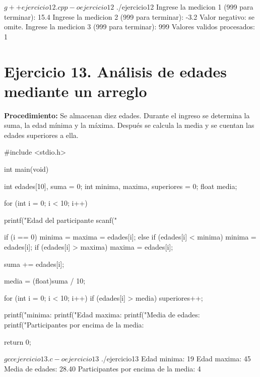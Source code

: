 \documentclass[11pt, a4paper]{article}
\begin{document}
\begin{terminalout}
$ g++ ejercicio12.cpp -o ejercicio12
$ ./ejercicio12
Ingrese la medicion 1 (999 para terminar): 15.4
Ingrese la medicion 2 (999 para terminar): -3.2
Valor negativo: se omite.
Ingrese la medicion 3 (999 para terminar): 999
Valores validos procesados: 1
\end{terminalout}

\newpage

\section*{Ejercicio 13. Análisis de edades mediante un arreglo}
\textbf{Procedimiento:} Se almacenan diez edades. Durante el ingreso se determina la suma, la edad mínima y la máxima. Después se calcula la media y se cuentan las edades superiores a ella.

\begin{codebox}[title={CÓDIGO FUENTE EN C: Ejercicio 13}]
#include <stdio.h>

int main(void) {
    int edades[10], suma = 0;
    int minima, maxima, superiores = 0;
    float media;

    for (int i = 0; i < 10; i++) {
        printf("Edad del participante %
        scanf("%

        if (i == 0) {
            minima = maxima = edades[i];
        } else {
            if (edades[i] < minima) minima = edades[i];
            if (edades[i] > maxima) maxima = edades[i];
        }

        suma += edades[i];
    }

    media = (float)suma / 10;

    for (int i = 0; i < 10; i++) {
        if (edades[i] > media) {
            superiores++;
        }
    }

    printf("\nEdad minima: %
    printf("Edad maxima: %
    printf("Media de edades: %
    printf("Participantes por encima de la media: %

    return 0;
}
\end{codebox}

\begin{terminalout}
$ gcc ejercicio13.c -o ejercicio13
$ ./ejercicio13
Edad minima: 19
Edad maxima: 45
Media de edades: 28.40
Participantes por encima de la media: 4
\end{terminalout}
\end{document}

